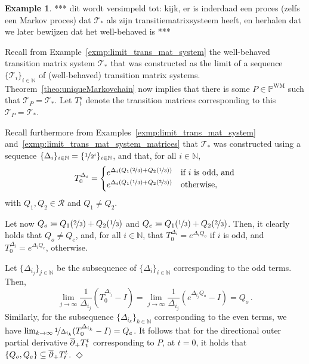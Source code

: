 \documentclass[10pt,a4paper]{paper}
\theoremstyle{definition}
\newtheorem{exmp}{Example}%
\newcommand{\nats}{\mathbb{N}}
\newcommand{\processes}{\mathbb{P}}
\newcommand{\wmprocesses}{\processes^{\mathrm{WM}}}
\newcommand{\coloneqq}{:\!=}
\newcommand{\exampleend}{\hfill$\Diamond$}
\begin{document}
\begin{exmp}\label{exmp:markov_with_no_deriv}
*** dit wordt versimpeld tot: kijk, er is inderdaad een proces (zelfs een Markov proces) dat $\mathcal{T}_*$ als zijn transitiematrixsysteem heeft, en herhalen dat we later bewijzen dat het well-behaved is ***

Recall from Example~\ref{exmp:limit_trans_mat_system} the well-behaved transition matrix system $\mathcal{T}_*$ that was constructed as the limit of a sequence $\{\mathcal{T}_i\}_{i\in\nats}$ of (well-behaved) transition matrix systems. Theorem~\ref{theo:uniqueMarkovchain} now implies that there is some $P\in\wmprocesses$ such that $\mathcal{T}_P = \mathcal{T}_*$. Let $T_t^s$ denote the transition matrices corresponding to this $\mathcal{T}_P = \mathcal{T}_*$.

Recall furthermore from Examples~\ref{exmp:limit_trans_mat_system} and~\ref{exmp:limit_trans_mat_system_matrices} that $\mathcal{T}_*$ was constructed using a sequence $\{\Delta_i\}_{i\in\nats}=\{\nicefrac{1}{2^i}\}_{i\in\nats}$, and that, for all $i\in\nats$,
\begin{equation*}
T_0^{\Delta_i} = \begin{cases}
e^{\Delta_i(Q_1(\nicefrac{2}{3}) + Q_2(\nicefrac{1}{3}))} & \text{if $i$ is odd, and} \\
e^{\Delta_i(Q_1(\nicefrac{1}{3}) + Q_2(\nicefrac{2}{3}))} & \text{otherwise,}
\end{cases}
\end{equation*}
with $Q_1,Q_2\in\mathcal{R}$ and $Q_1\neq Q_2$. 

Let now $Q_o\coloneqq Q_1(\nicefrac{2}{3}) + Q_2(\nicefrac{1}{3})$ and $Q_e\coloneqq Q_1(\nicefrac{1}{3}) + Q_2(\nicefrac{2}{3})$. Then, it clearly holds that $Q_o\neq Q_e$, and, for all $i\in\nats$, that $T_0^{\Delta_i}=e^{\Delta_i Q_o}$ if $i$ is odd, and $T_0^{\Delta_i}=e^{\Delta_iQ_e}$, otherwise.

Let $\{\Delta_{i_j}\}_{j\in\nats}$ be the subsequence of $\{\Delta_i\}_{i\in\nats}$ corresponding to the odd terms. Then,
\begin{equation*}
\lim_{j\to\infty}\frac{1}{\Delta_{i_j}}\left(T_0^{\Delta_{i_j}}-I\right) = \lim_{j\to\infty}\frac{1}{\Delta_{i_j}}\left(e^{\Delta_{i_j}Q_o}-I\right) = Q_o\,.
\end{equation*}
Similarly, for the subsequence $\{\Delta_{i_k}\}_{k\in\nats}$ corresponding to the even terms, we have $\lim_{k\to\infty}\nicefrac{1}{\Delta_{i_k}}(T_0^{\Delta_{i_k}}-I)=Q_e$. It follows that for the directional outer partial derivative $\smash{\overline{\partial}}_+T_t^t$ corresponding to $P$, at $t=0$, it holds that $\{Q_o,Q_e\}\subseteq \smash{\overline{\partial}}_+T_t^t$.
\exampleend
\end{exmp}
\end{document}
